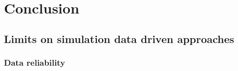 


\chapter{Conclusion} %

\label{Chapter5} %


\section{Limits on simulation data driven approaches}



\subsection{Data reliability}



